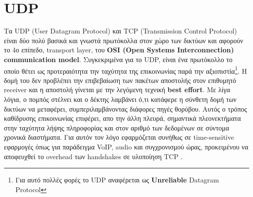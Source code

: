 \documentclass[hidelinks, 12pt, a4paper]{article}
\begin{document}

\pagebreak

\section{UDP}


Τα UDP (User Datagram Protocol) και TCP (Transmission Control Protocol) είναι δύο πολύ βασικά και γνωστά πρωτόκολλα στον χώρο των δικτύων και αφορούν το 4ο επίπεδο, transport layer, του \textbf{OSI (Open Systems Interconnection) communication model}. Συγκεκριμένα για το UDP, είναι ένα πρωτόκολλο το οποίο θέτει ως προτεραιότητα την ταχύτητα της επικοινωνίας παρά την αξιοπιστία\footnote{Για αυτό πολλές φορές το UDP αναφέρεται ως \textbf{Unreliable} Datagram Protocol}. Η δομή του δεν προβλέπει την επιβεβαίωση των πακέτων αποστολής στον επιθυμητό receiver και η αποστολή γίνεται με την λεγόμενη τεχνική \textbf{best effort}. Με λίγα λόγια, ο πομπός στέλνει και ο δέκτης λαμβάνει ό,τι κατάφερε η σύνθετη δομή των δικτύων να μεταφέρει, συμπεριλαμβάνοντας διάφορες πηγές θορύβου. Αυτός ο τρόπος καθίδρυσης επικοινωνίας επιφέρει, απο την άλλη πλευρά, σημαντικά πλεονεκτήματα στην ταχύτητα λήψης πληροφορίας και στον αριθμό των δεδομένων σε σύντομα χρονικά διαστήματα. Για αυτόν τον λόγο εφαρμόζεται συνήθως σε time-sensitive εφαρμογές όπως για παράδειγμα VoIP, audio και συγχρονισμού ώρας, προκειμένου να αποφευχθεί το overhead των handshakes σε υλοποίηση TCP \cite{searchnetworking, wiki_udp}.
\end{document}
